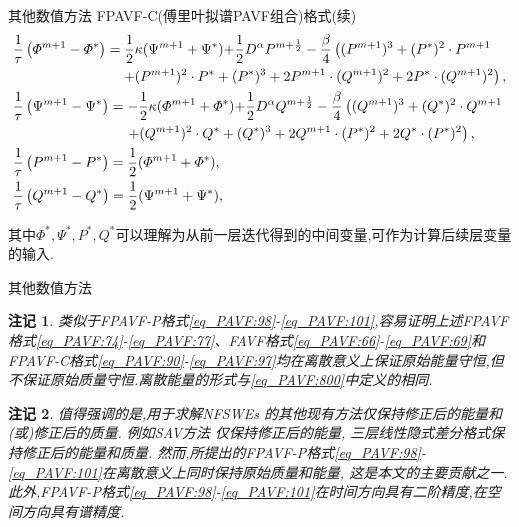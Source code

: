\documentclass[aspectratio=169]{beamer}
\newtheorem{remark}{注记}[section] %
\numberwithin{theorem}{section} %
\numberwithin{equation}{section}%
\numberwithin{figure}{section}%
\numberwithin{table}{section}%
\begin{document}
\begin{frame}{其他数值方法}
	\noindent FPAVF-C(傅里叶拟谱PAVF组合)格式(续)
	{\small\begin{align}\footnotesize
	&\frac{1}{\tau}\left(\varPhi^{m+1}-\varPhi^{*}\right)=\frac{1}{2}\kappa (\Psi^{m+1}+\Psi^{*}){+\frac{1}{2}D^{\alpha} P^{m+\frac{1}{2}}}-\frac{\beta}{4}\left((P^{m+1})^3+(P^{*})^{2}\cdot P^{m+1}\right.\nonumber\\
			&~~~~~~~~~~~~~~~~~~~~~~~\left.+(P^{m+1})^{2}\cdot P^{*}+ (P^{*})^{3}+2 P^{m+1}\cdot (Q^{m+1})^{2}+2 P^{*}\cdot (Q^{m+1})^{2}\right),\label{eq_PAVF:94}\\
	&\frac{1}{\tau}\left(\Psi^{m+1}-\Psi^{*}\right)=-\frac{1}{2}\kappa (\varPhi^{m+1}+\varPhi^{*}){+\frac{1}{2}D^{\alpha} Q^{m+\frac{1}{2}}}-\frac{\beta}{4}\left((Q^{m+1})^3+(Q^{*})^{2}\cdot Q^{m+1}\right.\nonumber\\
			&~~~~~~~~~~~~~~~~~~~~~~~~\left.+(Q^{m+1})^{2}\cdot Q^{*}+ (Q^{*})^{3}+2 Q^{m+1}\cdot (P^{*})^{2}+2 Q^{*}\cdot (P^{*})^{2}\right),\label{eq_PAVF:95}\\
	&\frac{1}{\tau}\left(P^{m+1}-P^{*}\right)=\frac{1}{2}(\varPhi^{m+1}+\varPhi^{*}),\label{eq_PAVF:96}\\
	&\frac{1}{\tau}\left(Q^{m+1}-Q^{*}\right)=\frac{1}{2}(\Psi^{m+1}+\Psi^{*}),\label{eq_PAVF:97}
	\end{align}}
	
	\noindent 其中$\Phi^*, \Psi^*, P^*, Q^*$可以理解为从前一层迭代得到的中间变量,可作为计算后续层变量的输入.
\end{frame}
\begin{frame}{其他数值方法}

	\begin{remark}\label{rk_PAVF:1}
		类似于FPAVF-P格式\eqref{eq_PAVF:98}-\eqref{eq_PAVF:101},容易证明上述FPAVF格式\eqref{eq_PAVF:74}-\eqref{eq_PAVF:77}、FAVF格式\eqref{eq_PAVF:66}-\eqref{eq_PAVF:69}和FPAVF-C格式\eqref{eq_PAVF:90}-\eqref{eq_PAVF:97}均在离散意义上保证原始能量守恒,但不保证原始质量守恒.离散能量的形式与\eqref{eq_PAVF:800}中定义的相同.
		\end{remark}
		
		\begin{remark}\label{rk_PAVF:2}
		值得强调的是,用于求解NFSWEs  的其他现有方法仅保持修正后的能量和(或)修正后的质量.
		例如SAV方法 \cite{chengConvergenceEnergyconservingScheme2022}仅保持修正后的能量,
		三层线性隐式差分格式\cite{ranLinearlyImplicitConservative2016}保持修正后的能量和质量.
		然而,所提出的FPAVF-P格式\eqref{eq_PAVF:98}-\eqref{eq_PAVF:101}在离散意义上同时保持原始质量和能量, 这是本文的主要贡献之一.
		此外,FPAVF-P格式\eqref{eq_PAVF:98}-\eqref{eq_PAVF:101}在时间方向具有二阶精度,在空间方向具有谱精度.
		\end{remark}
\end{frame}
\end{document}
